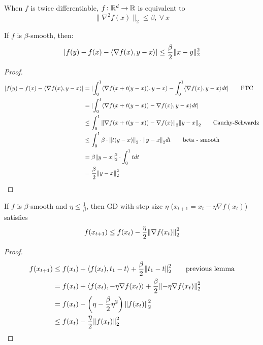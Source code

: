 \begin{remark}
    When \(f\) is twice differentiable, \(f \colon \mathbb{R}^d \to \mathbb{R}\) is equivalent to 
    \[
        \lVert \nabla^2 f(x)\rVert_2 \leq \beta, \ \forall \ x   
    \]
\end{remark}

\begin{lemma}
    If \(f\) is \(\beta\)-smooth, then: 
    \[
        \lvert  f(y) - f(x) - \langle \nabla f(x), y - x \rangle \rvert  \leq \frac{\beta}{2} \lVert x - y\rVert_2^2  
    \]
\end{lemma}


\begin{proof}
    \begin{align*}
        \lvert f(y) - f(x) - \langle \nabla f(x),  y - x  \rangle \rvert 
        &= \lvert  \int_0^1 \langle \nabla f(x + t(y-x)), y - x \rangle - \int_0^1 \langle \nabla f(x), y-x \rangle dt \rvert \tag*{FTC} \\ 
        &= \lvert \int_0^1 \langle \nabla f(x + t(y-x)) - \nabla f(x), y-x \rangle dt \rvert \\ 
        &\leq \int_0^1 \norm{\nabla f(x + t(y-x)) - \nabla f(x)}_2 \norm{y-x}_2 \tag*{Cauchy-Schwardz} \\ 
        &\leq \int_0^1 \beta \cdot \norm{t(y-x)}_2 \cdot \norm{y-x}_2 dt \tag*{beta - smooth}  \\ 
        &= \beta \norm{y-x}_2^2 \cdot \int_0^1 t dt \\ 
        &= \frac{\beta}{2} \norm{y-x}_2^2 
    \end{align*}
\end{proof}


\begin{lemma}
    If \(f\) is \(\beta\)-smooth and \(\eta \leq \frac{1}{\beta}\), then GD with 
    step size \(\eta\) (\(x_{t+1} = x_t - \eta \nabla f(x_t)\)) satisfies 
    \[
        f(x_{t+1}) \leq f(x_t) - \frac{\eta}{2} \norm{\nabla f(x_t)}_2^2 
    \]
\end{lemma}

\begin{proof}
    \begin{align*}
        f(x_{t+1}) &\leq f(x_t) + \innerProd{f(x_t)}{t_1 - t} + \frac{\beta}{2} \norm{t_1 - t}_2^2  \tag*{\text{previous lemma}} \\ 
        &=f(x_t) + \innerProd{f(x_t)}{- \eta \nabla f(x_t)} + \frac{\beta}{2} \norm{- \eta \nabla f(x_t)}_2^2 \\ 
        &= f(x_t) - \left( \eta - \frac{\beta}{2} \eta^2 \right) \norm{f(x_t)}_2^2 \\
        &\leq f(x_t) - \frac{\eta}{2} \norm{f(x_t)}_2^2
    \end{align*}
\end{proof}


